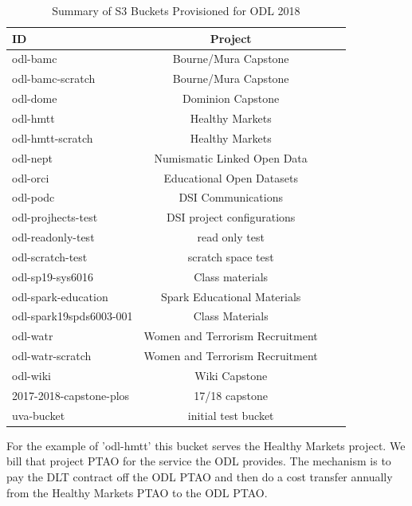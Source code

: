 \begin{table}[htbp]
\begin{center}
\begin{tabular}{lccr}
\hline
\hline
ID & Project \\
\hline
\hline
odl-bamc & Bourne/Mura Capstone  \\
odl-bamc-scratch & Bourne/Mura Capstone  \\
odl-dome & Dominion Capstone \\
odl-hmtt & Healthy Markets \\
odl-hmtt-scratch & Healthy Markets  \\
odl-nept & Numismatic Linked Open Data  \\
odl-orci & Educational Open Datasets  \\
odl-podc & DSI Communications  \\
odl-projhects-test & DSI project configurations  \\
odl-readonly-test & read only test  \\
odl-scratch-test & scratch space test  \\
odl-sp19-sys6016 & Class materials  \\
odl-spark-education & Spark Educational Materials  \\
odl-spark19spds6003-001 & Class Materials  \\
odl-watr & Women and Terrorism Recruitment  \\
odl-watr-scratch & Women and Terrorism Recruitment  \\
odl-wiki & Wiki Capstone  \\
\hline
2017-2018-capstone-plos & 17/18 capstone  \\
uva-bucket & initial test bucket  \\
\hline
\hline
\end{tabular}
\caption[S3 bucket summary]{Summary of S3 Buckets Provisioned for ODL 2018}
\end{center}
\end{table}

For the example of 'odl-hmtt' this bucket serves the Healthy Markets project. We bill that project PTAO for the service the ODL provides. The mechanism is to pay the DLT contract off the ODL PTAO and then do a cost transfer annually from the Healthy Markets PTAO to the ODL PTAO.

